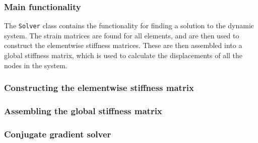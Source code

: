 \subsubsection{Main functionality}
The \texttt{Solver} class contains the functionality for finding a solution to the dynamic system. The strain matrices are found for all elements, and are then used to construct the elementwise stiffness matrices. These are then assembled into a global stiffness matrix, which is used to calculate the displacements of all the nodes in the system.
\subsubsection{Constructing the elementwise stiffness matrix}
\subsubsection{Assembling the global stiffness matrix}
\subsubsection{Conjugate gradient solver}
